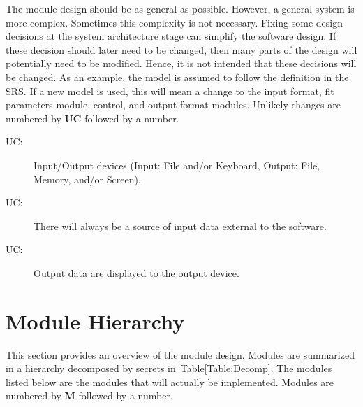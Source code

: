 \documentclass[12pt]{article}
\newcounter{ucnum}
\newcommand{\tableref}[1]{Table\ref{#1}}
\begin{document}
\hspace{3ex}The module design should be as general as
possible. However, a general system is more complex. Sometimes this
complexity is not necessary. Fixing some design decisions at the
system architecture stage can simplify the software design. If these
decision should later need to be changed, then many parts of the
design will potentially need to be modified. Hence, it is not intended
that these decisions will be changed.  As an example, the model is
assumed to follow the definition in the SRS.  If a new model is used,
this will mean a change to the input format, fit parameters module,
control, and output format modules. Unlikely changes are numbered by \textbf{UC} followed by a number.

\begin{description}
\item [UC\theucnum \label{UC_IO}:] Input/Output
  devices (Input: File and/or Keyboard, Output: File, Memory, and/or
  Screen).
\item [UC\theucnum \label{UC_inputsource}:]
  There will always be a source of input data external to the
  software.
\item [UC\theucnum \label{UC_output}:] Output
  data are displayed to the output device.
\end{description}


\section{Module Hierarchy} \label{SecMH}

\hspace{3ex}This section provides an overview of the module
design. Modules are summarized in a hierarchy decomposed by secrets
in~\tableref{Table:Decomp}. The modules listed below are the modules
that will actually be implemented. Modules are numbered by \textbf{M}
followed by a number.
\end{document}
